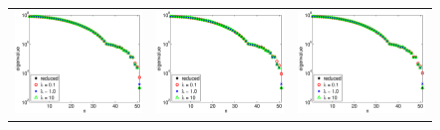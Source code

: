 \documentclass{iopart}
\begin{document}
{\begin{figure}
\centering
\begin{tabular}{ccc}
\includegraphics[scale=.2]{./figs/example3_a}&
\includegraphics[scale=.2]{./figs/example3_b}&
\includegraphics[scale=.2]{./figs/example3_c}\\

\end{tabular}
\end{figure}}
\end{document}

